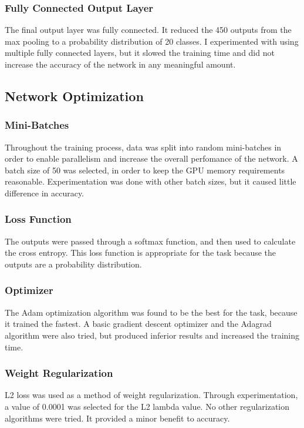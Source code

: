\documentclass{article}
\begin{document}
\subsubsection{Fully Connected Output Layer}
The final output layer was fully connected. It reduced the 450 outputs from the max pooling to a probability distribution of 20 classes.
I experimented with using multiple fully connected layers, but it slowed the training time and did not increase the accuracy of the network
in any meaningful amount.

\subsection{Network Optimization}

\subsubsection{Mini-Batches}
Throughout the training process, data was split into random mini-batches in order to enable parallelism and increase the overall perfomance of
the network. A batch size of 50 was selected, in order to keep the GPU memory requirements reasonable. Experimentation was done with other batch
sizes, but it caused little difference in accuracy.

\subsubsection{Loss Function}
The outputs were passed through a softmax function, and then used to calculate the cross entropy. This loss function is appropriate for the
task because the outputs are a probability distribution.

\subsubsection{Optimizer}
The Adam optimization algorithm was found to be the best for the task, because it trained the fastest. A basic gradient descent optimizer and the Adagrad
algorithm were also tried, but produced inferior results and increased the training time.

\subsubsection{Weight Regularization}
L2 loss was used as a method of weight regularization. Through experimentation, a value of 0.0001 was selected for the L2 lambda value.
No other regularization algorithms were tried. It provided a minor benefit to accuracy.
\end{document}
